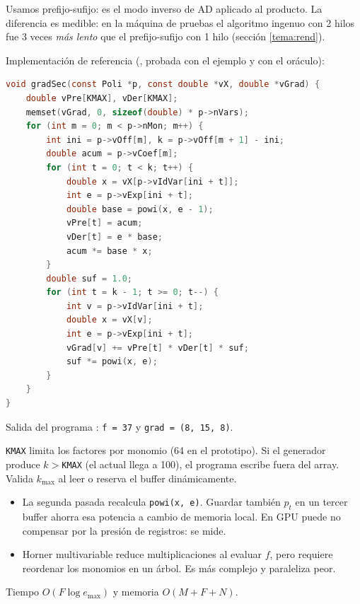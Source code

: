 \porque Usamos prefijo-sufijo: es el modo inverso de AD aplicado al producto. La diferencia es medible: en la máquina de pruebas el algoritmo ingenuo con 2 hilos fue 3 veces \emph{más lento} que el prefijo-sufijo con 1 hilo (sección \ref{tema:rend}).

\como Implementación de referencia (, probada con el ejemplo y con el oráculo):
\begin{lstlisting}[language=C]
void gradSec(const Poli *p, const double *vX, double *vGrad) {
    double vPre[KMAX], vDer[KMAX];
    memset(vGrad, 0, sizeof(double) * p->nVars);
    for (int m = 0; m < p->nMon; m++) {
        int ini = p->vOff[m], k = p->vOff[m + 1] - ini;
        double acum = p->vCoef[m];
        for (int t = 0; t < k; t++) {
            double x = vX[p->vIdVar[ini + t]];
            int e = p->vExp[ini + t];
            double base = powi(x, e - 1);
            vPre[t] = acum;
            vDer[t] = e * base;
            acum *= base * x;
        }
        double suf = 1.0;
        for (int t = k - 1; t >= 0; t--) {
            int v = p->vIdVar[ini + t];
            double x = vX[v];
            int e = p->vExp[ini + t];
            vGrad[v] += vPre[t] * vDer[t] * suf;
            suf *= powi(x, e);
        }
    }
}
\end{lstlisting}
Salida del programa : \texttt{f = 37} y \texttt{grad = (8, 15, 8)}.

\begin{trampa}
\texttt{KMAX} limita los factores por monomio (64 en el prototipo). Si el generador produce $k>$\texttt{KMAX} (el  actual llega a 100), el programa escribe fuera del array. Valida $k_{\max}$ al leer o reserva el buffer dinámicamente.
\end{trampa}

\alt
\begin{itemize}
\item La segunda pasada recalcula \texttt{powi(x, e)}. Guardar también $p_t$ en un tercer buffer ahorra esa potencia a cambio de memoria local. En GPU puede no compensar por la presión de registros: se mide.
\item Horner multivariable reduce multiplicaciones al evaluar $f$, pero requiere reordenar los monomios en un árbol. Es más complejo y paraleliza peor.
\end{itemize}

\que Tiempo $O(F\log e_{\max})$ y memoria $O(M+F+N)$.

